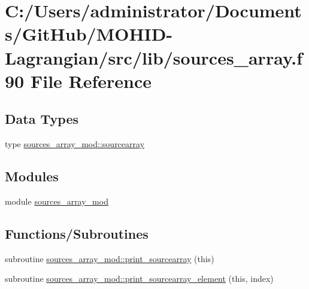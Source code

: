\hypertarget{sources__array_8f90}{}\section{C\+:/\+Users/administrator/\+Documents/\+Git\+Hub/\+M\+O\+H\+I\+D-\/\+Lagrangian/src/lib/sources\+\_\+array.f90 File Reference}
\label{sources__array_8f90}
\subsection*{Data Types}
\begin{DoxyCompactItemize}
\item 
type \hyperlink{structsources__array__mod_1_1sourcearray}{sources\+\_\+array\+\_\+mod\+::sourcearray}
\end{DoxyCompactItemize}
\subsection*{Modules}
\begin{DoxyCompactItemize}
\item 
module \hyperlink{namespacesources__array__mod}{sources\+\_\+array\+\_\+mod}
\end{DoxyCompactItemize}
\subsection*{Functions/\+Subroutines}
\begin{DoxyCompactItemize}
\item 
subroutine \hyperlink{namespacesources__array__mod_aa2e56a704fb4483fff2b2bd65c8db8da}{sources\+\_\+array\+\_\+mod\+::print\+\_\+sourcearray} (this)
\item 
subroutine \hyperlink{namespacesources__array__mod_a83b399b5839262af19adcae73824874e}{sources\+\_\+array\+\_\+mod\+::print\+\_\+sourcearray\+\_\+element} (this, index)
\end{DoxyCompactItemize}

